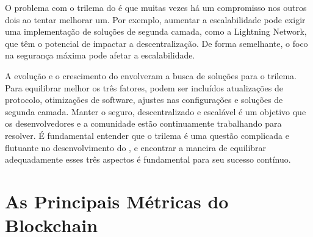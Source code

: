 \documentclass[a4paper,12pt]{article}
\newcommand{\printingbibliography}{%

    \pagestyle{myheadings}
    \markright{}
    \sloppy
    \printbibliography[heading=bibintoc, %
                   title=Refer\^encias %
                  ]
    \fussy%
}
\begin{document}
O problema com o trilema do \btcspace é que muitas vezes há um compromisso nos outros dois 
ao tentar melhorar um. Por exemplo, aumentar a escalabilidade pode exigir uma implementação 
de soluções de segunda camada, como a Lightning Network, que têm o potencial de impactar a
descentralização. De forma semelhante, o foco na segurança máxima pode afetar a escalabilidade.

A evolução e o crescimento do \btcspace envolveram a busca de soluções para o trilema. 
Para equilibrar melhor os três fatores, podem ser incluídos atualizações de protocolo, 
otimizações de software, ajustes nas configurações e soluções de segunda camada. Manter o \btcspace seguro, 
descentralizado e escalável é um objetivo que os desenvolvedores e a comunidade estão continuamente 
trabalhando para resolver. É fundamental entender que o trilema é uma questão complicada e flutuante 
no desenvolvimento do \btc, e encontrar a maneira de equilibrar adequadamente esses três aspectos é 
fundamental para seu sucesso contínuo.

\section{As Principais Métricas do Blockchain}




\printingbibliography
\end{document}
